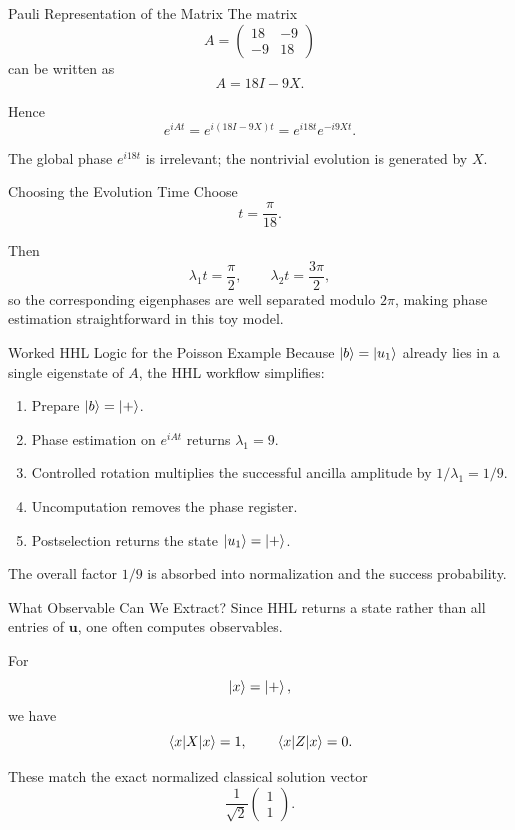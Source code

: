 \documentclass{beamer}
\begin{document}
\begin{frame}{Pauli Representation of the Matrix}
The matrix
\[
A=
\begin{pmatrix}
18 & -9\\
-9 & 18
\end{pmatrix}
\]
can be written as
\[
A = 18 I - 9 X.
\]

Hence
\[
e^{iAt}=e^{i(18I-9X)t}=e^{i18t}e^{-i9Xt}.
\]

The global phase \(e^{i18t}\) is irrelevant; the nontrivial evolution is generated by \(X\).
\end{frame}

\begin{frame}{Choosing the Evolution Time}
Choose
\[
t=\frac{\pi}{18}.
\]

Then
\[
\lambda_1 t = \frac{\pi}{2},
\qquad
\lambda_2 t = \frac{3\pi}{2},
\]
so the corresponding eigenphases are well separated modulo \(2\pi\), making phase estimation straightforward in this toy model.
\end{frame}

\begin{frame}{Worked HHL Logic for the Poisson Example}
Because \(\ket{b}=\ket{u_1}\) already lies in a single eigenstate of \(A\), the HHL workflow simplifies:

\begin{enumerate}
    \item Prepare \(\ket{b}=\ket{+}\).
    \item Phase estimation on \(e^{iAt}\) returns \(\lambda_1=9\).
    \item Controlled rotation multiplies the successful ancilla amplitude by \(1/\lambda_1=1/9\).
    \item Uncomputation removes the phase register.
    \item Postselection returns the state \(\ket{u_1}=\ket{+}\).
\end{enumerate}

The overall factor \(1/9\) is absorbed into normalization and the success probability.
\end{frame}

\begin{frame}{What Observable Can We Extract?}
Since HHL returns a state rather than all entries of \(\bm{u}\), one often computes observables.

For
\[
\ket{x}=\ket{+},
\]
we have
\[
\expval{X}{x}=1,
\qquad
\expval{Z}{x}=0.
\]

These match the exact normalized classical solution vector
\[
\frac{1}{\sqrt{2}}
\begin{pmatrix}
1\\
1
\end{pmatrix}.
\]
\end{frame}
\end{document}
